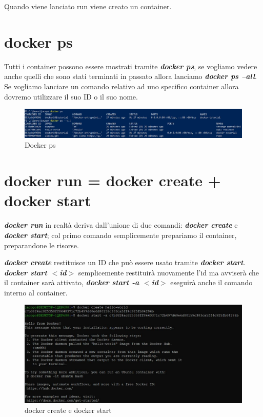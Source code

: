 \documentclass[11pt,a4paper]{book}
\begin{document}
Quando viene lanciato run viene creato un container. 

\section{docker ps}
Tutti i container possono essere mostrati tramite \emph{\textbf{docker ps}}, se vogliamo vedere anche quelli che sono stati terminati in passato allora lanciamo \emph{\textbf{docker ps --all}}. Se vogliamo lanciare un comando relativo ad uno specifico container allora dovremo utilizzare il suo ID o il suo nome.

\begin{figure}[h!]
	\begin{center}
		\includegraphics[scale=0.5]{img/001.jpg}
		\caption{Docker ps}
		\label{fig: 001}
	\end{center}
\end{figure}

\section{docker run = docker create + docker start}
\emph{\textbf{docker run}} in realtà deriva dall'unione di due comandi: \emph{\textbf{docker create}} e \emph{\textbf{docker start}}; col primo comando semplicemente prepariamo il container, preparandone le risorse.

\emph{\textbf{docker create}} restituisce un ID che può essere usato tramite \emph{\textbf{docker start}}. \emph{\textbf{docker start $<$id$>$}} semplicemente restituirà nuovamente l'id ma avviserà che il container sarà attivato, \emph{\textbf{docker start -a $<$id$>$}} eseguirà anche il comando interno al container.

\begin{figure}[h!]
	\begin{center}
		\includegraphics[scale=0.6]{img/003.jpg}
		\caption{docker create e docker start}
		\label{fig: 003}
	\end{center}
\end{figure}
\end{document}
